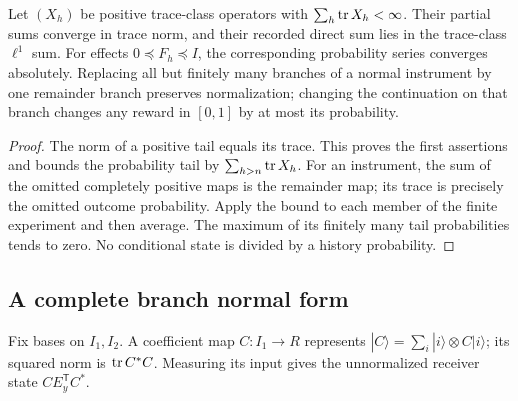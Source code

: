 \begin{lemma}\label{lem:countable91}
Let $(X_h)$ be positive trace-class operators with
$\sum_h\operatorname{tr} X_h<\infty$.  Their partial sums converge in trace norm,
and their recorded direct sum lies in the trace-class $\ell^1$ sum.
For effects $0\preceq F_h\preceq I$, the corresponding probability
series converges absolutely.  Replacing all but finitely many branches
of a normal instrument by one remainder branch preserves normalization;
changing the continuation on that branch changes any reward in $[0,1]$
by at most its probability.
\end{lemma}
\begin{proof}
The norm of a positive tail equals its trace.  This proves the first
assertions and bounds the probability tail by $\sum_{h>n}\operatorname{tr} X_h$.
For an instrument, the sum of the omitted completely positive maps is
the remainder map; its trace is precisely the omitted outcome
probability.  Apply the bound to each member of the finite experiment
and then average.  The maximum of its finitely many tail probabilities
tends to zero.  No conditional state is divided by a history probability.
\end{proof}

\subsection{A complete branch normal form}
Fix bases on $I_1,I_2$.  A coefficient map $C:I_1\to R$ represents
$|C\rangle=\sum_i|i\rangle\otimes C|i\rangle$; its squared norm is
$\operatorname{tr} C^*C$.  Measuring its input gives the unnormalized receiver state
$CE_y^{\mathsf T}C^*$.

